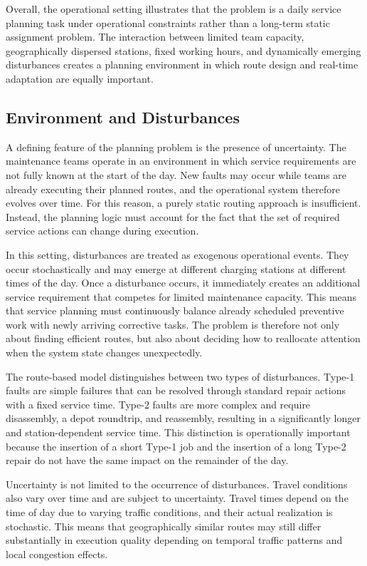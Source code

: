 \documentclass[12pt,oneside]{article}
\begin{document}
Overall, the operational setting illustrates that the problem is a daily service planning task under operational constraints rather than a long-term static assignment problem. The interaction between limited team capacity, geographically dispersed stations, fixed working hours, and dynamically emerging disturbances creates a planning environment in which route design and real-time adaptation are equally important.
\subsection{Environment and Disturbances}\label{subsec_environment_and_disturbances}
A defining feature of the planning problem is the presence of uncertainty. The maintenance teams operate in an environment in which service requirements are not fully known at the start of the day. New faults may occur while teams are already executing their planned routes, and the operational system therefore evolves over time. For this reason, a purely static routing approach is insufficient. Instead, the planning logic must account for the fact that the set of required service actions can change during execution.

In this setting, disturbances are treated as exogenous operational events. They occur stochastically and may emerge at different charging stations at different times of the day. Once a disturbance occurs, it immediately creates an additional service requirement that competes for limited maintenance capacity. This means that service planning must continuously balance already scheduled preventive work with newly arriving corrective tasks. The problem is therefore not only about finding efficient routes, but also about deciding how to reallocate attention when the system state changes unexpectedly.

The route-based model distinguishes between two types of disturbances. Type-1 faults are simple failures that can be resolved through standard repair actions with a fixed service time. Type-2 faults are more complex and require disassembly, a depot roundtrip, and reassembly, resulting in a significantly longer and station-dependent service time. This distinction is operationally important because the insertion of a short Type-1 job and the insertion of a long Type-2 repair do not have the same impact on the remainder of the day.

Uncertainty is not limited to the occurrence of disturbances. Travel conditions also vary over time and are subject to uncertainty. Travel times depend on the time of day due to varying traffic conditions, and their actual realization is stochastic. This means that geographically similar routes may still differ substantially in execution quality depending on temporal traffic patterns and local congestion effects.
\end{document}
